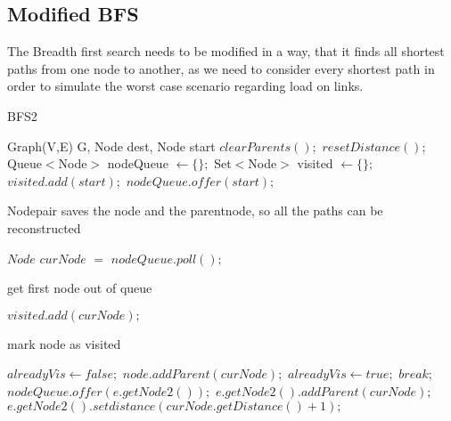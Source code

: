 \documentclass [12pt]{article}
\begin{document}
    \subsection{Modified BFS}
    The Breadth first search needs to be modified in a way, that it finds all shortest paths
    from one node to another, as we need to consider every shortest path in order to simulate
    the worst case scenario regarding load on links.
    \begin{algorithm}[H]
        \caption{BFS2}
        \begin{algorithmic}[2]
            \Require Graph(V,E) G, Node dest, Node start
            \State $clearParents();$
            \State $resetDistance();$
            \State Queue$<$Node$>$ nodeQueue $\gets \{\};$
            \State Set$<$Node$>$ visited $\gets \{\};$
            \State $visited.add(start);$
            \State $nodeQueue.offer(start);$ \Comment \begin{itshape} Nodepair saves the node and the parentnode,
            so all the paths can be reconstructed\end{itshape}
            \State $Node$ $curNode$ $=$ $nodeQueue.poll();$ \Comment \begin{itshape} get first node out of queue\end{itshape}
            \State $visited.add(curNode);$ \Comment \begin{itshape} mark node as visited\end{itshape}            
                \EndIf
                        \State $alreadyVis \gets false;$
                            \State $node.addParent(curNode);$
                            \State $alreadyVis \gets true;$
                            \State $break;$
                        \EndFor
                        \State $nodeQueue.offer(e.getNode2());$
                        \State $e.getNode2().addParent(curNode);$
                        \State $e.getNode2().setdistance(curNode.getDistance()+1);$
                        \EndIf
                    \EndIf
                \EndIf
            \EndFor
            \EndWhile


            
        \end{algorithmic}
    \end{algorithm}
\end{document}
